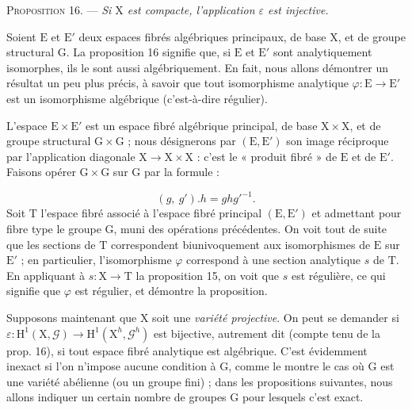 \textsc{Proposition} 16. --- \textit{Si $\mathrm{X}$ est compacte, l'application $\varepsilon$ est injective.}

Soient $\mathrm{E}$ et $\mathrm{E}'$ deux espaces fibrés algébriques principaux, de base $\mathrm{X}$, et de groupe structural $\mathrm{G}$. La proposition 16 signifie que, si $\mathrm{E}$ et $\mathrm{E}'$ sont analytiquement isomorphes, ils le sont aussi algébriquement. En fait, nous allons démontrer un résultat un peu plus précis, à savoir que tout isomorphisme analytique $\varphi : \mathrm{E} \to \mathrm{E}'$ est un isomorphisme algébrique (c'est-à-dire régulier).

L'espace $\mathrm{E} \times \mathrm{E}'$ est un espace fibré algébrique principal, %
de base $\mathrm{X} \times \mathrm{X}$, et de groupe structural $\mathrm{G} \times \mathrm{G}$ ; nous désignerons par $(\mathrm{E}, \mathrm{E}')$ son image réciproque par l'application diagonale $\mathrm{X} \to \mathrm{X} \times \mathrm{X}$ : c'est le « produit fibré » de $\mathrm{E}$ et de $\mathrm{E}'$. Faisons opérer $\mathrm{G} \times \mathrm{G}$ sur $\mathrm{G}$ par la formule :

\begin{equation*}
(g,\ g').h = gh{g'}^{-1}.
\end{equation*}
Soit $\mathrm{T}$ l'espace fibré associé à l'espace fibré principal $(\mathrm{E}, \mathrm{E}')$ et admettant pour fibre type le groupe $\mathrm{G}$, muni des opérations précédentes. On voit tout de suite que les sections de $\mathrm{T}$ correspondent biunivoquement aux isomorphismes de $\mathrm{E}$ sur $\mathrm{E}'$ ; en particulier, l'isomorphisme $\varphi$ correspond à une section analytique $s$ de $\mathrm{T}$. En appliquant à $s : \mathrm{X} \to \mathrm{T}$ la proposition 15, on voit que $s$ est régulière, ce qui signifie que $\varphi$ est régulier, et démontre la proposition.

Supposons maintenant que $\mathrm{X}$ soit une \textit{variété projective}. On peut se demander si $\varepsilon : \mathrm{H}^1(\mathrm{X}, \mathcal{G}) \to \mathrm{H}^1(\mathrm{X}^h, \mathcal{G}^h)$ est bijective, autrement dit (compte tenu de la prop. 16), si tout espace fibré analytique est algébrique. C'est évidemment inexact si l'on n'impose aucune condition à $\mathrm{G}$, comme le montre le cas où $\mathrm{G}$ est une variété abélienne (ou un groupe fini) ; dans les propositions suivantes, nous allons indiquer un certain nombre de groupes $\mathrm{G}$ pour lesquels c'est exact.

